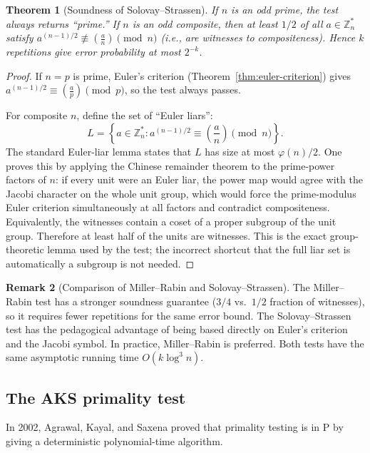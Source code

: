\documentclass[twoside,12pt]{book}
\theoremstyle{plain}
\newtheorem{theorem}{Theorem}[chapter]
\theoremstyle{definition}
\newtheorem{remark}[theorem]{Remark}
\theoremstyle{remark}
\begin{document}
\begin{theorem}[Soundness of Solovay--Strassen]
\label{thm:solovay-strassen}
If $n$ is an odd prime, the test always returns ``prime.'' If $n$ is an odd composite, then at least $1/2$ of all $a \in \mathbb{Z}_n^*$ satisfy $a^{(n-1)/2} \not\equiv \left(\frac{a}{n}\right) \pmod{n}$ (i.e., are witnesses to compositeness). Hence $k$ repetitions give error probability at most $2^{-k}$.
\end{theorem}

\begin{proof}
If $n = p$ is prime, Euler's criterion (Theorem~\ref{thm:euler-criterion}) gives $a^{(n-1)/2} \equiv \left(\frac{a}{p}\right) \pmod{p}$, so the test always passes.

For composite $n$, define the set of ``Euler liars'':
\[
L = \left\{a \in \mathbb{Z}_n^* : a^{(n-1)/2} \equiv \left(\frac{a}{n}\right) \pmod{n}\right\}.
\]
The standard Euler-liar lemma states that $L$ has size at most
$\varphi(n)/2$. One proves this by applying the Chinese remainder theorem to
the prime-power factors of $n$: if every unit were an Euler liar, the power
map would agree with the Jacobi character on the whole unit group, which
would force the prime-modulus Euler criterion simultaneously at all factors
and contradict compositeness. Equivalently, the witnesses contain a coset of
a proper subgroup of the unit group. Therefore at least half of the units are
witnesses. This is the exact group-theoretic lemma used by the test; the
incorrect shortcut that the full liar set is automatically a subgroup is not
needed.
\end{proof}

\begin{remark}[Comparison of Miller--Rabin and Solovay--Strassen]
The Miller--Rabin test has a stronger soundness guarantee ($3/4$ vs.\ $1/2$ fraction of witnesses), so it requires fewer repetitions for the same error bound. The Solovay--Strassen test has the pedagogical advantage of being based directly on Euler's criterion and the Jacobi symbol. In practice, Miller--Rabin is preferred. Both tests have the same asymptotic running time $O(k \log^3 n)$.
\end{remark}

\subsection{The AKS primality test}

In 2002, Agrawal, Kayal, and Saxena proved that primality testing is in $\text{P}$ by giving a deterministic polynomial-time algorithm.
\end{document}
